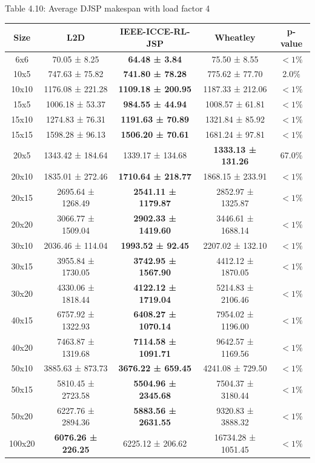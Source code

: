 \begin{table}
    Table 4.10: Average DJSP makespan with load factor 4\\
    \vspace{1mm}
    \label{table:4.8}
    \footnotesize 
    \begin{tabular}{ccccc}
    \toprule
    Size & L2D & IEEE-ICCE-RL-JSP & Wheatley & p-value \\
    \midrule
    6x6 & 70.05 ± 8.25 & \textbf{64.48 ± 3.84} & 75.50 ± 8.55 & $< 1\%$ \\
    10x5 & 747.63 ± 75.82 & \textbf{741.80 ± 78.28} & 775.62 ± 77.70 & 2.0$\%$ \\
    10x10 & 1176.08 ± 221.28 & \textbf{1109.18 ± 200.95} & 1187.33 ± 212.06 & $< 1\%$ \\
    15x5 & 1006.18 ± 53.37 & \textbf{984.55 ± 44.94} & 1008.57 ± 61.81 & $< 1\%$ \\
    15x10 & 1274.83 ± 76.31 & \textbf{1191.63 ± 70.89} & 1321.84 ± 85.92 & $< 1\%$ \\
    15x15 & 1598.28 ± 96.13 & \textbf{1506.20 ± 70.61} & 1681.24 ± 97.81 & $< 1\%$ \\
    20x5 & 1343.42 ± 184.64 & 1339.17 ± 134.68 & \textbf{1333.13 ± 131.26} & 67.0$\%$ \\
    20x10 & 1835.01 ± 272.46 & \textbf{1710.64 ± 218.77} & 1868.15 ± 233.91 & $< 1\%$ \\
    20x15 & 2695.64 ± 1268.49 & \textbf{2541.11 ± 1179.87} & 2852.97 ± 1325.87 & $< 1\%$ \\
    20x20 & 3066.77 ± 1509.04 & \textbf{2902.33 ± 1419.60} & 3446.61 ± 1688.14 & $< 1\%$ \\
    30x10 & 2036.46 ± 114.04 & \textbf{1993.52 ± 92.45} & 2207.02 ± 132.10 & $< 1\%$ \\
    30x15 & 3955.84 ± 1730.05 & \textbf{3742.95 ± 1567.90} & 4412.12 ± 1870.05 & $< 1\%$ \\
    30x20 & 4330.06 ± 1818.44 & \textbf{4122.12 ± 1719.04} & 5214.83 ± 2106.46 & $< 1\%$ \\
    40x15 & 6757.92 ± 1322.93 & \textbf{6408.27 ± 1070.14} & 7954.02 ± 1196.00 & $< 1\%$ \\
    40x20 & 7463.87 ± 1319.68 & \textbf{7114.58 ± 1091.71} & 9642.57 ± 1169.56 & $< 1\%$ \\
    50x10 & 3885.63 ± 873.73 & \textbf{3676.22 ± 659.45} & 4241.08 ± 729.50 & $< 1\%$ \\
    50x15 & 5810.45 ± 2723.58 & \textbf{5504.96 ± 2345.68} & 7504.37 ± 3180.44 & $< 1\%$ \\
    50x20 & 6227.76 ± 2894.36 & \textbf{5883.56 ± 2631.55} & 9320.83 ± 3888.32 & $< 1\%$ \\
    100x20 & \textbf{6076.26 ± 226.25} & 6225.12 ± 206.62 & 16734.28 ± 1051.45 & $< 1\%$ \\
    \bottomrule
    \end{tabular}
\end{table}
    
